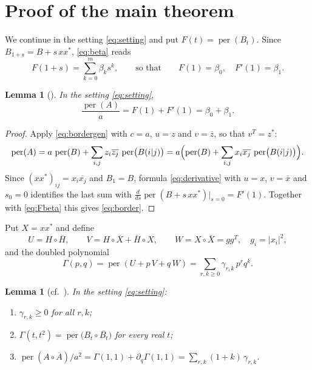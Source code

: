 \documentclass[11pt]{amsart}
\newtheorem{lemma}[theorem]{Lemma}
\theoremstyle{remark}
\numberwithin{equation}{section}
\newcommand{\per}{\operatorname{per}}
\newcommand{\conj}[1]{\overline{#1}}
\begin{document}
\section{Proof of the main theorem}\label{sec:proof}

We continue in the setting \eqref{eq:setting} and put $F(t)=\per(B_t)$. Since $B_{1+s}=B+s\,xx^*$, \eqref{eq:beta} reads
\begin{equation}\label{eq:Fbeta}
F(1+s)=\sum_{k=0}^m\beta_ks^k,\qquad\text{so that}\qquad F(1)=\beta_0,\quad F'(1)=\beta_1 .
\end{equation}
\begin{lemma}[{\cite[Proposition~3.2]{LZL}}]\label{lem:border}
In the setting \eqref{eq:setting},
\begin{equation}\label{eq:border}
\frac{\per(A)}{a}=F(1)+F'(1)=\beta_0+\beta_1 .
\end{equation}
\end{lemma}

\begin{proof}
Apply \eqref{eq:bordergen} with $c=a$, $u=z$ and $v=\conj{z}$, so that $v^T=z^*$:
\[
\per(A)=a\,\per(B)+\sum_{i,j}z_i\conj{z_j}\,\per\bigl(B(i|j)\bigr)=a\Bigl(\per(B)+\sum_{i,j}x_i\conj{x_j}\,\per\bigl(B(i|j)\bigr)\Bigr).
\]
Since $(xx^*)_{ij}=x_i\conj{x_j}$ and $B_1=B$, formula \eqref{eq:derivative} with $u=x$, $v=\conj{x}$ and $s_0=0$ identifies the last sum with $\frac{d}{ds}\per(B+s\,xx^*)|_{s=0}=F'(1)$. Together with \eqref{eq:Fbeta} this gives \eqref{eq:border}.
\end{proof}

Put $X=xx^*$ and define
\[
U=H\circ\conj{H},\qquad V=H\circ\conj{X}+\conj{H}\circ X,\qquad W=X\circ\conj{X}=gg^T,\quad g_i=|x_i|^2,
\]
and the doubled polynomial
\begin{equation}\label{eq:Gamma}
\Gamma(p,q)=\per(U+p\,V+q\,W)=\sum_{r,k\ge0}\gamma_{r,k}\,p^rq^k .
\end{equation}

\begin{lemma}[{cf.\ \cite[Propositions~3.2 and~4.1]{LZL}}]\label{lem:doubled}
In the setting \eqref{eq:setting}:
\begin{enumerate}
\item[(a)] $\gamma_{r,k}\ge0$ for all $r,k$;
\item[(b)] $\Gamma(t,t^2)=\per\bigl(B_t\circ\conj{B_t}\bigr)$ for every real $t$;
\item[(c)] $\per(A\circ\conj{A})/a^2=\Gamma(1,1)+\partial_q\Gamma(1,1)=\sum_{r,k}(1+k)\,\gamma_{r,k}$.
\end{enumerate}
\end{lemma}
\end{document}

